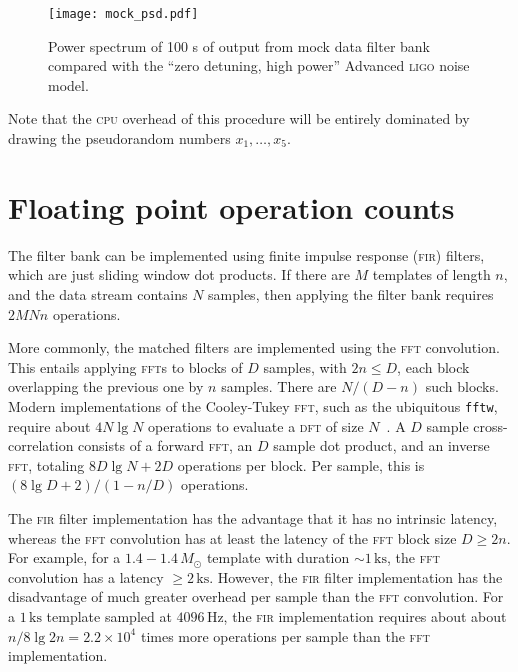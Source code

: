 \begin{figure}[h!]
\begin{center}
\texttt{[image: mock\_psd.pdf]}
\caption{Power spectrum of 100 s of output from mock data filter bank compared with the ``zero detuning, high power'' Advanced \textsc{ligo} noise model.}
\label{fig:mock-psd}
\end{center}
\end{figure}

Note that the \textsc{cpu} overhead of this procedure will be entirely dominated by drawing the pseudorandom numbers $x_1, \dots, x_5$.


\section{Floating point operation counts}

 The filter bank can be implemented using finite impulse response (\textsc{fir}) filters, which are just sliding window dot products.  If there are $M$ templates of length $n$, and the data stream contains $N$ samples, then applying the filter bank requires $2 M N n$ operations.

More commonly, the matched filters are implemented using the \textsc{fft} convolution.  This entails applying \textsc{fft}s to blocks of $D$ samples, with $2 n \leq D$, each block overlapping the previous one by $n$ samples.  There are $N/(D-n)$ such blocks.  Modern implementations of the Cooley-Tukey \textsc{fft}, such as the ubiquitous \texttt{fftw}, require about $4 N \lg N$ operations to evaluate a \textsc{dft} of size $N$~\cite{Johnson:2007p9654}.    A $D$ sample cross-correlation consists of a forward \textsc{fft}, an $D$ sample dot product, and an inverse \textsc{fft}, totaling $8 D \lg N + 2 D$ operations per block.  Per sample, this is $(8 \lg D + 2) / (1 - n/D)$ operations. 

The \textsc{fir} filter implementation has the advantage that it has no intrinsic latency, whereas the \textsc{fft} convolution has at least the latency of the \textsc{fft} block size $D \geq 2 n$.   For example, for a $1.4 - 1.4 \, M_\odot$ template with duration $\sim 1 \, \mathrm{ks}$, the \textsc{fft} convolution has a latency $\geq 2 \, \mathrm{ks}$.  However, the \textsc{fir} filter implementation has the disadvantage of much greater overhead per sample than the \textsc{fft} convolution.  For a $1\,\mathrm{ks}$ template sampled at $4096\,\mathrm{Hz}$, the \textsc{fir} implementation requires about about $n / 8 \lg 2 n = 2.2 \times 10^4$ times more operations per sample than the \textsc{fft} implementation.



